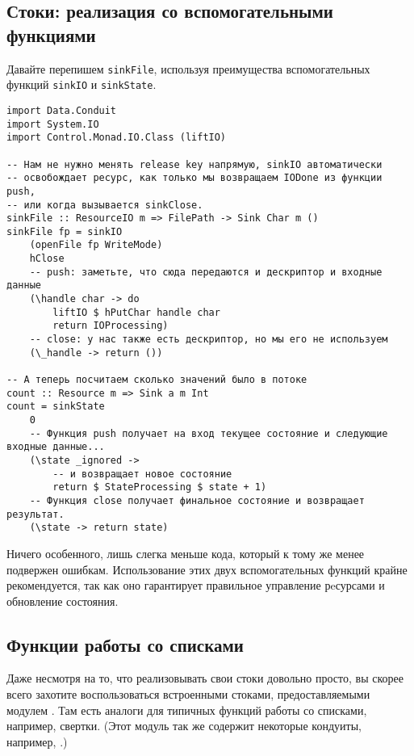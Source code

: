 \subsection{Стоки: реализация со вспомогательными функциями}
Давайте перепишем \lstinline'sinkFile', используя преимущества вспомогательных функций
\lstinline'sinkIO' и \lstinline'sinkState'.
\begin{lstlisting}
import Data.Conduit
import System.IO
import Control.Monad.IO.Class (liftIO)

-- Нам не нужно менять release key напрямую, sinkIO автоматически
-- освобождает ресурс, как только мы возвращаем IODone из функции push,
-- или когда вызывается sinkClose.
sinkFile :: ResourceIO m => FilePath -> Sink Char m ()
sinkFile fp = sinkIO
    (openFile fp WriteMode)
    hClose
    -- push: заметьте, что сюда передаются и дескриптор и входные данные
    (\handle char -> do
        liftIO $ hPutChar handle char
        return IOProcessing)
    -- close: у нас также есть дескриптор, но мы его не используем
    (\_handle -> return ())

-- А теперь посчитаем сколько значений было в потоке
count :: Resource m => Sink a m Int
count = sinkState
    0
    -- Функция push получает на вход текущее состояние и следующие входные данные...
    (\state _ignored ->
        -- и возвращает новое состояние
        return $ StateProcessing $ state + 1)
    -- Функция close получает финальное состояние и возвращает результат.
    (\state -> return state)
\end{lstlisting}
Ничего особенного, лишь слегка меньше кода, который к тому же менее подвержен ошибкам. Использование этих двух
вспомогательных  функций крайне рекомендуется, так как оно гарантирует правильное
управление рeсурсами и обновление состояния.

\subsection{Функции работы со списками}
Даже несмотря на то, что реализовывать свои стоки довольно просто, вы скорее всего захотите воспользоваться встроенными стоками, предоставляемыми модулем
. Там есть аналоги для типичных функций работы со
списками, например, свертки. (Этот модуль так же содержит некоторые кондуиты,
например,
.)

